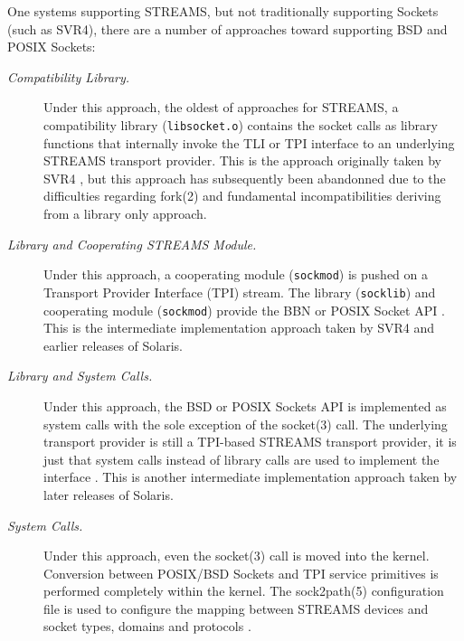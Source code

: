 \documentclass[letterpaper,final,notitlepage,twocolumn,10pt,twoside]{article}
\begin{document}
One systems supporting STREAMS, but not traditionally supporting Sockets (such
as SVR4), there are a number of approaches toward supporting BSD and POSIX
Sockets:

\begin{description}

\item[{\it Compatibility Library.}]

Under this approach, the oldest of approaches for STREAMS, a compatibility
library (\texttt{libsocket.o}) contains the socket calls as library functions
that internally invoke the TLI or TPI interface to an underlying STREAMS
transport provider.  This is the approach originally taken by SVR4
\cite[]{magic}, but this approach has subsequently been abandonned due to the
difficulties regarding fork(2) and fundamental incompatibilities deriving from
a library only approach.

\item[{\it Library and Cooperating STREAMS Module.}]

Under this approach, a cooperating module (\texttt{sockmod}) is pushed on a
Transport Provider Interface (TPI) stream.  The library (\texttt{socklib}) and
cooperating module (\texttt{sockmod}) provide the BBN or POSIX Socket
API \cite[]{impbsd} \cite[]{socklib}.  This is the intermediate implementation
approach taken by SVR4 and earlier releases of Solaris.

\item[{\it Library and System Calls.}]

Under this approach, the BSD or POSIX Sockets API is implemented as system
calls with the sole exception of the socket(3) call.  The underlying transport
provider is still a TPI-based STREAMS transport provider, it is just that
system calls instead of library calls are used to implement the interface
\cite[]{socklib}.  This is another intermediate implementation approach taken
by later releases of Solaris.

\item[{\it System Calls.}]

Under this approach, even the socket(3) call is moved into the kernel.
Conversion between POSIX/BSD Sockets and TPI service primitives is performed
completely within the kernel.  The sock2path(5) configuration file is used to
configure the mapping between STREAMS devices and socket types, domains and
protocols \cite[]{socklib}.

\end{description}
\end{document}
